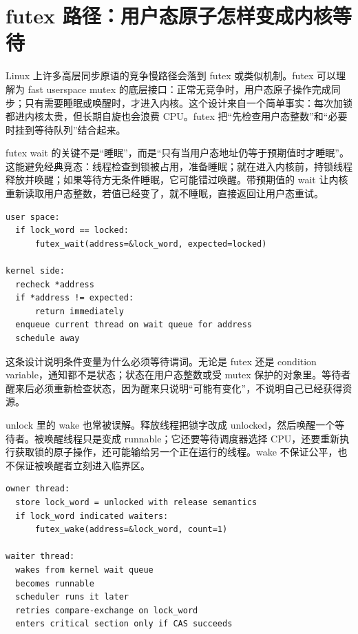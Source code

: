 \section{futex 路径：用户态原子怎样变成内核等待}

Linux 上许多高层同步原语的竞争慢路径会落到 futex 或类似机制。futex 可以理解为 fast userspace mutex 的底层接口：正常无竞争时，用户态原子操作完成同步；只有需要睡眠或唤醒时，才进入内核。这个设计来自一个简单事实：每次加锁都进内核太贵，但长期自旋也会浪费 CPU。futex 把“先检查用户态整数”和“必要时挂到等待队列”结合起来。

futex wait 的关键不是“睡眠”，而是“只有当用户态地址仍等于预期值时才睡眠”。这能避免经典竞态：线程检查到锁被占用，准备睡眠；就在进入内核前，持锁线程释放并唤醒；如果等待方无条件睡眠，它可能错过唤醒。带预期值的 wait 让内核重新读取用户态整数，若值已经变了，就不睡眠，直接返回让用户态重试。

\begin{lstlisting}[numbers=none,caption={futex wait 的竞态防护直觉}]
user space:
  if lock_word == locked:
      futex_wait(address=&lock_word, expected=locked)

kernel side:
  recheck *address
  if *address != expected:
      return immediately
  enqueue current thread on wait queue for address
  schedule away
\end{lstlisting}

这条设计说明条件变量为什么必须等待谓词。无论是 futex 还是 condition variable，通知都不是状态；状态在用户态整数或受 mutex 保护的对象里。等待者醒来后必须重新检查状态，因为醒来只说明“可能有变化”，不说明自己已经获得资源。

unlock 里的 wake 也常被误解。释放线程把锁字改成 unlocked，然后唤醒一个等待者。被唤醒线程只是变成 runnable；它还要等待调度器选择 CPU，还要重新执行获取锁的原子操作，还可能输给另一个正在运行的线程。wake 不保证公平，也不保证被唤醒者立刻进入临界区。

\begin{lstlisting}[numbers=none,caption={unlock 到 waiter 真正进入临界区之间的路径}]
owner thread:
  store lock_word = unlocked with release semantics
  if lock_word indicated waiters:
      futex_wake(address=&lock_word, count=1)

waiter thread:
  wakes from kernel wait queue
  becomes runnable
  scheduler runs it later
  retries compare-exchange on lock_word
  enters critical section only if CAS succeeds
\end{lstlisting}

